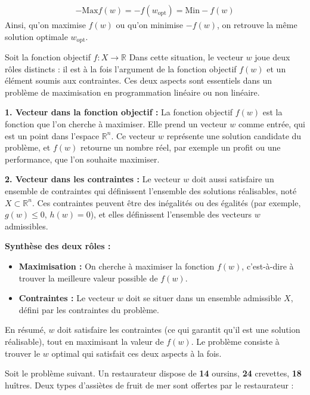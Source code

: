 \documentclass{report}
\begin{document}
\begin{multicols*}{3}
\begin{Preuve}{}{}
    \begin{align*}
        - \text{Max} f(w) = 
        - f\left(w_{\text{opt}}\right) = 
        \text{Min} -f(w)
    \end{align*}
    Ainsi, qu'on maximise $f(w)$ ou qu'on minimise $-f(w)$, on retrouve la 
    même solution optimale $w_{\text{opt}}$.
\end{Preuve}






\begin{Explication*}{}{}
    Soit la fonction objectif $f : X \rightarrow \mathbb{R}$  
Dans cette situation, le vecteur \( w \) joue deux rôles distincts : il est à la 
fois l'argument de la fonction objectif \( f(w) \) et un élément soumis aux 
contraintes. Ces deux aspects sont essentiels dans un problème de maximisation 
en programmation linéaire ou non linéaire.

\vspace{1em}%
\textbf{1. Vecteur dans la fonction objectif :}
La fonction objectif \( f(w) \) est la fonction que l'on cherche à maximiser. 
Elle prend un vecteur \( w \) comme entrée, qui est un point dans l'espace 
\( \mathbb{R}^n \). Ce vecteur \( w \) représente une solution candidate du 
problème, et \( f(w) \) retourne un nombre réel, par exemple un profit ou une 
performance, que l'on souhaite maximiser.

\vspace{1em}%
\textbf{2. Vecteur dans les contraintes :}
Le vecteur \( w \) doit aussi satisfaire un ensemble de contraintes qui 
définissent l'ensemble des solutions réalisables, noté \( X \subset \mathbb{R}^n \).
Ces contraintes peuvent être des inégalités ou des égalités (par exemple, 
\( g(w) \leq 0 \), \( h(w) = 0 \)), et elles définissent l'ensemble des vecteurs 
\( w \) admissibles.

\vspace{1em}%
\textbf{Synthèse des deux rôles :}
\begin{itemize}
    \item \textbf{Maximisation :} On cherche à maximiser la fonction \( f(w) \), 
    c'est-à-dire à trouver la meilleure valeur possible de \( f(w) \).
    \item \textbf{Contraintes :} Le vecteur \( w \) doit se situer dans un 
    ensemble admissible \( X \), défini par les contraintes du problème.
\end{itemize}

En résumé, \( w \) doit satisfaire les contraintes (ce qui garantit qu'il est 
une solution réalisable), tout en maximisant la valeur de \( f(w) \). Le problème
consiste à trouver le \( w \) optimal qui satisfait ces deux aspects à la fois.
\end{Explication*}                  
Soit le problème suivant. Un restaurateur dispose de \textbf{14} oursins, 
\textbf{24} crevettes, \textbf{18} huîtres. Deux types d'assiètes 
de fruit de mer sont offertes par le restaurateur :


\end{multicols*}
\end{document}

